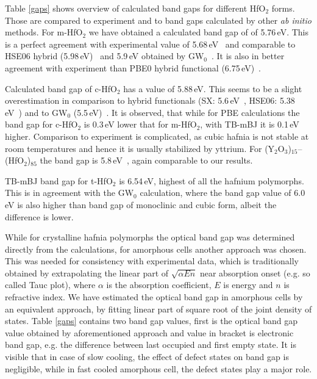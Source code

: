 \documentclass[10pt,a4paper,twocolumn]{article}
\begin{document}
Table \ref{gaps} shows overview of calculated band gaps for different HfO$_2$ forms.
Those are compared to experiment and to band gaps calculated by other \textit{ab initio} methods.
For m-HfO$_2$ we have obtained a calculated band gap of of 5.76\,eV.
This is a perfect agreement with experimental value of 5.68\,eV~\cite{Balog1977} and comparable to HSE06 hybrid (5.98\,eV)~\cite{Komsa2010} and 5.9\,eV obtained by GW$_0$~\cite{Gruning2010}.
It is also in better agreement with experiment than PBE0 hybrid functional (6.75\,eV)~\cite{Komsa2010}.

Calculated band gap of c-HfO$_2$ has a value of 5.88\,eV.
This seems to be a slight overestimation in comparison to hybrid functionals (SX: 5.6\,eV~\cite{Clark2010}, HSE06: 5.38\,eV~\cite{Yang2014}) and to GW$_0$ (5.5\,eV)~\cite{Gruning2010}.
It is observed, that while for PBE calculations the band gap for c-HfO$_2$ is 0.3\,eV lower that for m-HfO$_2$, with TB-mBJ it is 0.1\,eV higher.
Comparison to experiment is complicated, as cubic hafnia is not stable at room temperatures and hence it is usually stabilized by yttrium.
For (Y$_2$O$_3$)$_{15}$--(HfO$_2$)$_{85}$ the band gap is 5.8\,eV~\cite{Lim2002}, again comparable to our results.

TB-mBJ band gap for t-HfO$_2$ is 6.54\,eV, highest of all the hafnium polymorphs.
This is in agreement with the GW$_0$ calculation, where the band gap value of 6.0\,eV is also higher than band gap of monoclinic and cubic form, albeit the difference is lower.

While for crystalline hafnia polymorphs the optical band gap was determined directly from the calculations, for amorphous cells another approach was chosen.
This was needed for consistency with experimental data, which is traditionally obtained by extrapolating the linear part of $\sqrt{\alpha E n}$ near absorption onset (e.g. so called Tauc plot), where $\alpha$ is the absorption coefficient, $E$ is energy and $n$ is refractive index.
We have estimated the optical band gap in amorphous cells by an equivalent approach, by fitting linear part of square root of the joint density of states.
Table \ref{gaps} contains two band gap values, first is the optical band gap value obtained by aforementioned approach and value in bracket is electronic band gap, e.g. the difference between last occupied and first empty state.
It is visible that in case of slow cooling, the effect of defect states on band gap is negligible, while in fast cooled amorphous cell, the defect states play a major role.
\end{document}
